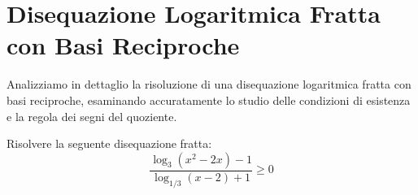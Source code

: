 \documentclass[11pt,a4paper,oneside]{report}
\begin{document}
\section{Disequazione Logaritmica Fratta con Basi Reciproche}
Analizziamo in dettaglio la risoluzione di una disequazione logaritmica fratta con basi reciproche, esaminando accuratamente lo studio delle condizioni di esistenza e la regola dei segni del quoziente.

\begin{esercizio}
Risolvere la seguente disequazione fratta:
\begin{equation}
    \frac{\log_3(x^2 - 2x) - 1}{\log_{1/3}(x - 2) + 1} \ge 0
\end{equation}
\end{esercizio}
\end{document}
